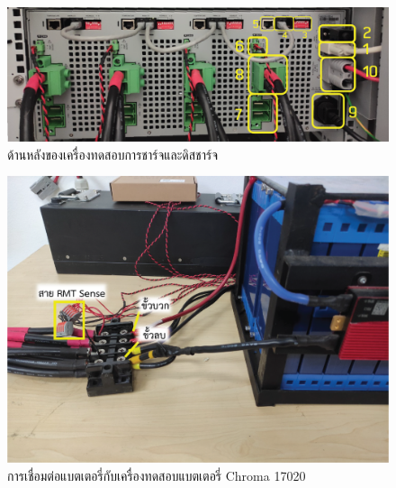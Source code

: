 \begin{center}
	\begin{figure}[H]
		\includegraphics[width=1\linewidth]{Chapters/img/Rear_Panel_Connection.png}
		\centering
		\captionsetup{justification=centering,margin=2cm}
		\caption{ด้านหลังของเครื่องทดสอบการชาร์จและดิสชาร์จ}
		\label{fig:Rear_Panel}
	\end{figure}
	\begin{figure}[H]
		\includegraphics[width=1\linewidth]{Chapters/img/Wire_Conn.png}
		\centering
		\captionsetup{justification=centering,margin=2cm}
		\caption{การเชื่อมต่อแบตเตอรี่กับเครื่องทดสอบแบตเตอรี่ Chroma 17020}
		\label{fig:Wire_Conn}
	\end{figure}
\end{center}
